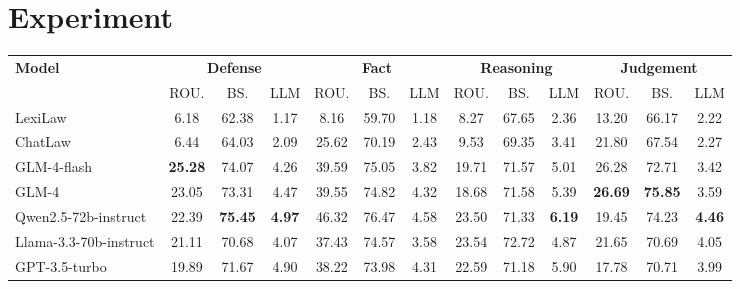 
\section{Experiment}

\begin{table*}[t]
\small
\begin{tabular}{lcccccccccccc}
\hline
\multirow{2}{*}{\textbf{Model}} & \multicolumn{3}{c}{\textbf{Defense}}                     & \multicolumn{3}{c}{\textbf{Fact}}                       & \multicolumn{3}{c}{\textbf{Reasoning}}                   & \multicolumn{3}{c}{\textbf{Judgement}}                   \\
                       & ROU.           & BS.            & LLM           & ROU.           & BS.            & LLM           & ROU.           & BS.            & LLM           & ROU.           & BS.            & LLM           \\ \hline
LexiLaw                & 6.18           & 62.38          & 1.17          & 8.16           & 59.70          & 1.18          & 8.27           & 67.65          & 2.36          & 13.20          & 66.17          & 2.22          \\
ChatLaw                & 6.44           & 64.03          & 2.09          & 25.62          & 70.19          & 2.43          & 9.53           & 69.35          & 3.41          & 21.80          & 67.54          & 2.27          \\
GLM-4-flash            & \textbf{25.28} & 74.07          & 4.26          & 39.59          & 75.05          & 3.82          & 19.71          & 71.57          & 5.01          & 26.28          & 72.71          & 3.42          \\
GLM-4                  & 23.05          & 73.31          & 4.47          & 39.55          & 74.82          & 4.32          & 18.68          & 71.58          & 5.39          & \textbf{26.69} & \textbf{75.85} & 3.59          \\
Qwen2.5-72b-instruct   & 22.39          & \textbf{75.45} & \textbf{4.97} & 46.32          & 76.47          & 4.58          & 23.50          & 71.33          & \textbf{6.19} & 19.45          & 74.23          & \textbf{4.46} \\
Llama-3.3-70b-instruct & 21.11          & 70.68          & 4.07          & 37.43          & 74.57          & 3.58          & 23.54          & 72.72          & 4.87          & 21.65          & 70.69          & 4.05          \\
GPT-3.5-turbo          & 19.89          & 71.67          & 4.90          & 38.22          & 73.98          & 4.31          & 22.59          & 71.18          & 5.90          & 17.78          & 70.71          & 3.99          \\

\end{tabular}
\end{table*}
